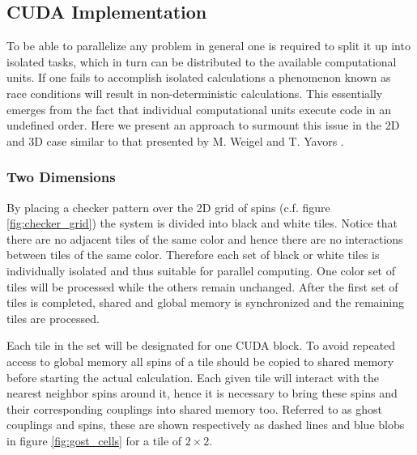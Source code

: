 \documentclass[paper=a4, fontsize=11pt]{scrartcl} %
\numberwithin{equation}{section} %
\numberwithin{figure}{section} %
\numberwithin{table}{section} %
\begin{document}
\subsection{CUDA Implementation}
To be able to parallelize any problem in general one is required to split it up into isolated tasks, which in turn can be distributed to the available computational units. If one fails to accomplish isolated calculations a phenomenon known as race conditions will result in non-deterministic calculations. This essentially emerges from the fact that individual computational units execute code in an undefined order. Here we present an approach to surmount this issue in the 2D and 3D case similar to that presented by M. Weigel and T. Yavors \cite{gpu_mc_spins}.

\subsubsection{Two Dimensions}
By placing a checker pattern over the 2D grid of spins (c.f. figure \ref{fig:checker_grid}) the system is divided into black and white tiles. Notice that there are no adjacent tiles of the same color and hence there are no interactions between tiles of the same color. Therefore each set of black or white tiles is individually isolated and thus suitable for parallel computing. One color set of tiles will be processed while the others remain unchanged. After the first set of tiles is completed, shared and global memory is synchronized and the remaining tiles are processed.

Each tile in the set will be designated for one CUDA block. To avoid repeated access to global memory all spins of a tile should be copied to shared memory before starting the actual calculation. Each given tile will interact with the nearest neighbor spins around it, hence it is necessary to bring these spins and their corresponding couplings into shared memory too. Referred to as ghost couplings and spins, these are shown respectively as dashed lines and blue blobs in figure \ref{fig:gost_cells} for a tile of $2\times2$.
\end{document}
